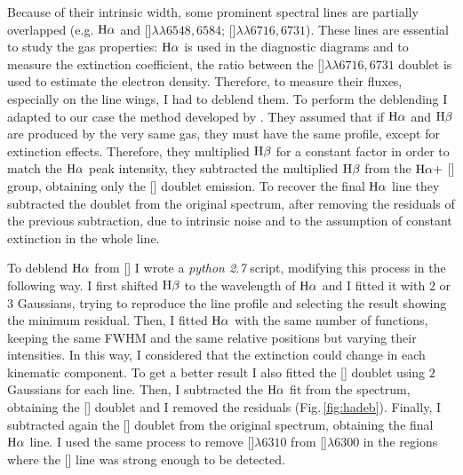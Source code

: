 \documentclass[../main.tex]{subfiles}
\begin{document}
Because of their intrinsic width, some prominent spectral lines are partially overlapped (e.g. $\rm H\alpha$ and []$\lambda\lambda6548,6584$; []$\lambda\lambda6716,6731$).
These lines are essential to study the gas properties: $\rm H\alpha$ is used in the diagnostic diagrams \citep{Baldwin81,Veilleux87}  and to measure the extinction coefficient, the ratio between the []$\lambda\lambda6716,6731$ doublet is used to estimate the electron density.
Therefore, to measure their fluxes, especially on the line wings, I had to deblend them.
To perform the deblending I adapted to our case the method developed by \citet{Schirmer13}.
They assumed that if $\rm H\alpha$ and $\rm H\beta$ are produced by the very same gas, they must have the same profile, except for extinction effects.
Therefore, they multiplied $\rm H\beta$ for a constant factor in order to match the $\rm H\alpha$ peak intensity, they subtracted the multiplied $\rm H\beta$ from the $\rm H\alpha +$ [] group, obtaining only the [] doublet emission.
To recover the final $\rm H\alpha$ line they subtracted the doublet from the original spectrum, after removing the residuals of the previous subtraction, due to intrinsic noise and to the assumption of constant extinction in the whole line.

To deblend $\rm H\alpha$ from [] I wrote a \textit{python 2.7} script, modifying this process in the following way. 
I first shifted $\rm H\beta$ to the wavelength of $\rm H\alpha$ and I fitted it with $2$ or $3$ Gaussians, trying to reproduce the line profile and selecting the result showing the minimum residual.
Then, I fitted $\rm H\alpha$ with the same number of functions, keeping the same FWHM and the same relative positions but varying their intensities.
In this way, I considered that the extinction could change in each kinematic component.
To get a better result I also fitted the [] doublet using $2$ Gaussians for each line.
Then, I subtracted the $\rm H\alpha$ fit from the spectrum, obtaining the [] doublet and I removed the residuals (Fig.\,\ref{fig:hadeb}).
Finally, I subtracted again the [] doublet from the original spectrum, obtaining the final $\rm H\alpha$ line.
I used the same process to remove []$\lambda6310$ from []$\lambda6300$ in the regions where the [] line was strong enough to be detected.
\end{document}
